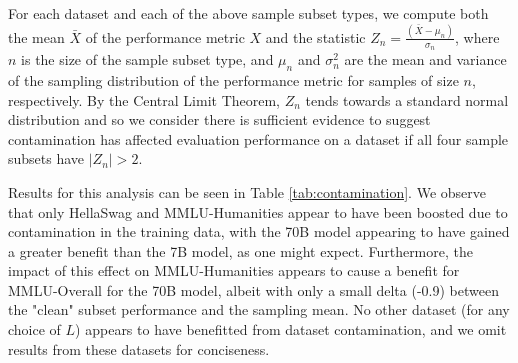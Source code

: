 For each dataset and each of the above sample subset types, we compute both the mean $\bar{X}$ of the performance metric $X$ and the statistic 
$Z_n = \frac{(\bar{X}-\mu_n)}{\sigma_n}$, where $n$ is the size of the sample subset type, and $\mu_n$ and $\sigma_n^2$ are the mean and variance of the sampling distribution of the performance metric for samples of size $n$, respectively. By the Central Limit Theorem, $Z_n$ tends towards a standard normal distribution and so we consider there is sufficient evidence to suggest contamination has affected evaluation performance on a dataset if all four sample subsets have $|Z_n|>2$.

Results for this analysis can be seen in Table \ref{tab:contamination}.  We observe that only HellaSwag and MMLU-Humanities appear to have been boosted due to contamination in the training data, with the 70B model appearing to have gained a greater benefit than the 7B model, as one might expect. Furthermore, the impact of this effect on MMLU-Humanities appears to cause a benefit for MMLU-Overall for the 70B model, albeit with only a small delta (-0.9) between the "clean" subset performance and the sampling mean. No other dataset (for any choice of $L$) appears to have benefitted from dataset contamination, and we omit results from these datasets for conciseness.


